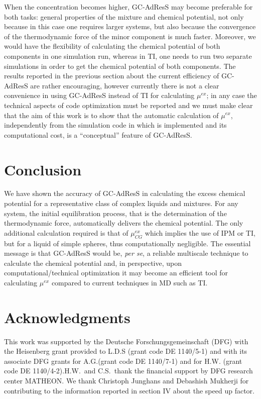 \documentclass[a4paper,preprint,unsortedaddress]{revtex4-1}
\newcommand{\recheck}[1]{{\color{red} #1}}
\begin{document}
When the concentration becomes higher, GC-AdResS may become preferable for both tasks: general properties of the mixture and chemical potential, not only because in this case one requires larger systems, but also because the convergence of the thermodynamic force of the minor component is much faster. Moreover, we would have the flexibility of calculating the chemical potential
of both components in one simulation run, whereas in TI, one needs to run two separate simulations in order to get the chemical potential of both components.
\recheck{The results reported in the previous section about the current efficiency of GC-AdResS are rather encouraging, however currently there is not a clear convenience in using GC-AdResS instead of TI for calculating $\mu^{ex}$; 
in any case the technical aspects of code optimization must be reported and we must make clear that the aim of this work is to show that  the automatic calculation of $\mu^{ex}$, independently from the simulation code in which is implemented and its computational cost, is a ``conceptual'' feature of GC-AdResS}.
  
\section{Conclusion} 
We have shown the accuracy of GC-AdResS in calculating the excess chemical potential for a representative class of complex liquids and mixtures. 
For any system, the initial equilibration process, that is the determination of the thermodynamic force, automatically delivers the chemical potential. The only additional calculation required is that of $\mu^{ex}_{CG}$ which implies the use of IPM or TI, but for a liquid of simple spheres, thus computationally negligible.  
The essential message is that GC-AdResS would be, {\it per se}, a reliable multiscale technique to calculate the chemical potential and, in perspective, upon computational/technical optimization it may become an efficient tool for calculating $\mu^{ex}$ compared to current techniques in MD such as TI. 

\section*{Acknowledgments}
This work was supported by the Deutsche Forschungsgemeinschaft (DFG) with the Heisenberg grant provided to L.D.S (grant code DE 1140/5-1) and with its associate DFG grants for A.G.(grant code DE 1140/7-1) and for H.W. (grant code DE 1140/4-2).H.W.~and C.S.~thank the financial support by DFG research center MATHEON. \recheck{We thank Christoph Junghans and Debashish Mukherji for contributing to the information reported in section IV about the speed up factor}.
\end{document}
